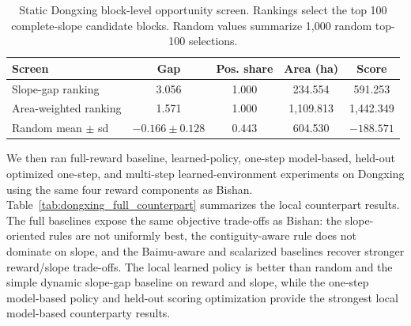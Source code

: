 \documentclass[11pt]{article}
\begin{document}
\begin{table}[htbp]
\centering
\small
\setlength{\tabcolsep}{4pt}
\caption{Static Dongxing block-level opportunity screen. Rankings select the top 100 complete-slope candidate blocks. Random values summarize 1{,}000 random top-100 selections.}
\label{tab:dongxing_screen}
\begin{tabular}{lcccc}
\toprule
Screen & Gap & Pos. share & Area (ha) & Score \\
\midrule
Slope-gap ranking & 3.056 & 1.000 & 234.554 & 591.253 \\
Area-weighted ranking & 1.571 & 1.000 & 1{,}109.813 & 1{,}442.349 \\
Random mean $\pm$ sd & $-0.166 \pm 0.128$ & 0.443 & 604.530 & $-188.571$ \\
\bottomrule
\end{tabular}
\end{table}

We then ran full-reward baseline, learned-policy, one-step model-based, held-out optimized one-step, and multi-step learned-environment experiments on Dongxing using the same four reward components as Bishan. Table~\ref{tab:dongxing_full_counterpart} summarizes the local counterpart results. The full baselines expose the same objective trade-offs as Bishan: the slope-oriented rules are not uniformly best, the contiguity-aware rule does not dominate on slope, and the Baimu-aware and scalarized baselines recover stronger reward/slope trade-offs. The local learned policy is better than random and the simple dynamic slope-gap baseline on reward and slope, while the one-step model-based policy and held-out scoring optimization provide the strongest local model-based counterparty results.
\end{document}
